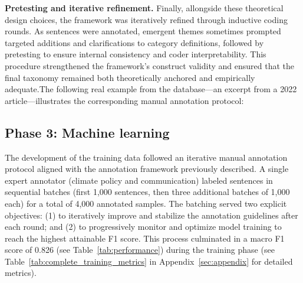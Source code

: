 \documentclass[12pt]{article}
\renewcommand\_{\texttt{\detokenize{_}\allowbreak}}
\begin{document}
{\bfseries{Pretesting and iterative refinement.}} Finally, allongside these theoretical design choices, the framework was iteratively refined through inductive coding rounds. As sentences were annotated, emergent themes sometimes prompted targeted additions and clarifications to category definitions, followed by pretesting to ensure internal consistency and coder interpretability. This procedure strengthened the framework’s construct validity and ensured that the final taxonomy remained both theoretically anchored and empirically adequate.The following real example from the database—an excerpt from a 2022 article—illustrates the corresponding manual annotation protocol:

\begin{figure}[H]
\centering
{}
\end{figure}

\subsection{Phase 3: Machine learning}

The development of the training data followed an iterative manual annotation protocol aligned with the annotation framework previously described. A single expert annotator (climate policy and communication) labeled sentences in sequential batches (first 1,000 sentences, then three additional batches of 1,000 each) for a total of 4,000 annotated samples. The batching served two explicit objectives: (1) to iteratively improve and stabilize the annotation guidelines after each round; and (2) to progressively monitor and optimize model training to reach the highest attainable F1 score. This process culminated in a macro F1 score of 0.826 (see Table~\ref{tab:performance}) during the training phase (see Table~\ref{tab:complete_training_metrics} in Appendix~\ref{sec:appendix} for detailed metrics).
\end{document}
